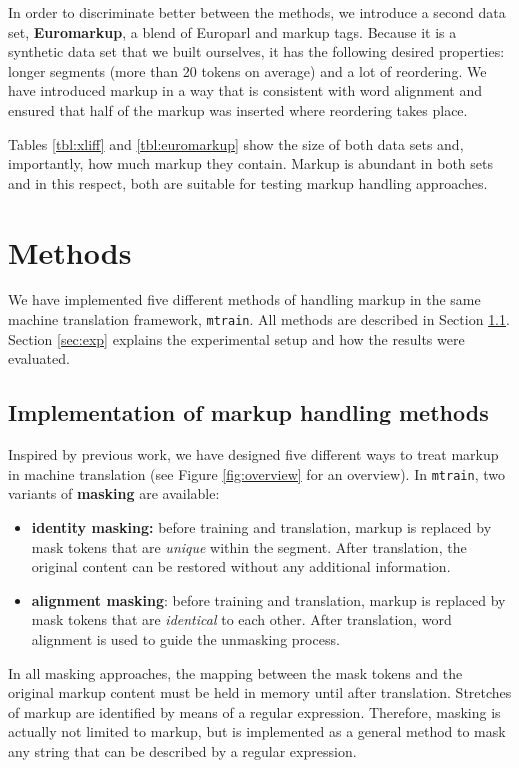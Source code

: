 \documentclass[11pt,letterpaper]{article}
\begin{document}
In order to discriminate better between the methods, we introduce a second data set, \textbf{Euromarkup}, a blend of Europarl \cite{koehn2005europarl} and markup tags. Because it is a synthetic data set that we built ourselves, it has the following desired properties: longer segments (more than 20 tokens on average) and a lot of reordering. We have introduced markup in a way that is consistent with word alignment and ensured that half of the markup was inserted where reordering takes place. 

Tables \ref{tbl:xliff} and \ref{tbl:euromarkup} show the size of both data sets and, importantly, how much markup they contain. Markup is abundant in both sets and in this respect, both are suitable for testing markup handling approaches.


\section{Methods}

We have implemented five different methods of handling markup in the same machine translation framework, \texttt{mtrain}. All methods are described in Section \ref{sec:methods}. Section \ref{sec:exp} explains the experimental setup and how the results were evaluated.

\subsection{Implementation of markup handling methods} \label{sec:methods}

Inspired by previous work, we have designed five different ways to treat markup in machine translation (see Figure \ref{fig:overview} for an overview). In  \texttt{mtrain}, two variants of \textbf{masking} are available:

\begin{itemize}
\item \textbf{identity masking:} before training and translation, markup is replaced by mask tokens that are \textit{unique} within the segment. After translation, the original content can be restored without any additional information.
\item \textbf{alignment masking}: before training and translation, markup is replaced by mask tokens that are \textit{identical} to each other. After translation, word alignment is used to guide the unmasking process.
\end{itemize}

\noindent In all masking approaches, the mapping between the mask tokens and the original markup content must be held in memory until after translation. Stretches of markup are identified by means of a regular expression. Therefore, masking is actually not limited to markup, but is implemented as a general method to mask any string that can be described by a regular expression. 
\end{document}
